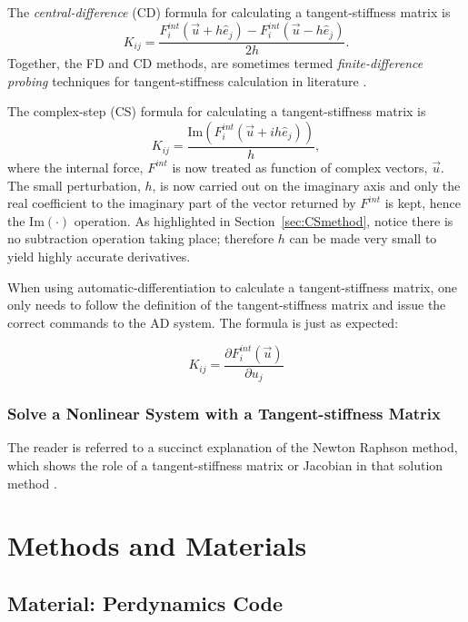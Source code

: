 \documentclass[preprint,12pt]{elsarticle}
\begin{document}
The \emph{central-difference} (CD) formula for calculating a tangent-stiffness matrix is
%
\begin{equation} 
  K_{ij} = \frac{F_i^{int}(\vec{u} + h \hat{e}_j) - F_i^{int}(\vec{u} - h \hat{e}_j)}{2 h}.
\end{equation}
%
Together, the FD and CD methods, are sometimes termed \emph{finite-difference probing} techniques for tangent-stiffness calculation in literature \cite{ref-Adaggio}.

The complex-step (CS) formula for calculating a tangent-stiffness matrix is
%
\begin{equation} 
  K_{ij} = \frac{\mbox{Im}(F_i^{int}(\vec{u} + i h \hat{e}_j))}{h},
\end{equation}
%
where the internal force, $F^{int}$ is now treated as function of complex vectors,  $\vec{u}$. The small perturbation, $h$, is now carried out on the imaginary axis and only the real coefficient to the imaginary part of the vector returned by $F^{int}$ is kept, hence the $\mbox{Im}(\cdot)$ operation. As highlighted in Section~\ref{sec:CSmethod}, notice there is no subtraction operation taking place; therefore $h$ can be made very small to yield highly accurate derivatives.

When using automatic-differentiation to calculate a tangent-stiffness matrix, one only needs to follow the definition of the tangent-stiffness matrix and issue the correct commands to the AD system. The formula is just as expected:

\begin{equation} K_{ij} = \frac{\partial F_i^{int}(\vec{u})}{\partial u_j} \end{equation}

\subsubsection{Solve a Nonlinear System with a Tangent-stiffness Matrix} \label{solve_a_system}
The reader is referred to a succinct explanation of the Newton Raphson method, which shows the
role of a tangent-stiffness matrix or Jacobian in that solution method \cite[chap.
13]{young2009}. 

\section{Methods and Materials} 

\subsection{Material: Perdynamics Code}
\end{document}
